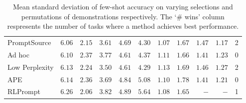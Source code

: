 \begin{table*}[]
{\begin{tabular}{lrrrrrrrrrc}
\greyrule
PromptSource        &  $6.06$ & $2.15$ & $3.61$ & $4.69$ &  $4.30$ &    $\mathbf{1.07}$ &   $1.67$ &   $1.47$ &  $\mathbf{1.17}$ & 2\\
Ad hoc              &  $6.10$ & $2.37$ & $3.77$ & $4.61$ &  $4.37$ &    $1.11$ &   $1.66$ &   $1.41$ &  $1.23$ & 0\\
\greyrule
Low Perplexity      &  $6.13$ & $2.24$ & $\mathbf{3.50}$ & $4.61$ &  $\mathbf{4.29}$ &    $1.13$ &   $1.69$ &   $1.46$ &  $1.27$ & 2\\
APE                 &  $6.14$ & $2.36$ & $3.69$ & $4.84$ &  $5.08$ &    $1.10$ &   $1.78$ &   $1.41$ &  $1.21$ & 0\\
RLPrompt            &  $6.26$ & $2.06$ & $3.82$ & $4.89$ &  $5.64$ &    $1.08$ &   $\mathbf{1.65}$ &      $-$ &     $-$ & 1\\ 
\bottomrule
\end{tabular}
}
\caption{Mean standard deviation of few-shot accuracy on varying selections and permutations of demonstrations respectively. The `\# wins' column respresents the number of tasks where a method achieves best performance.
}
\label{table:std_mean}
\end{table*}
